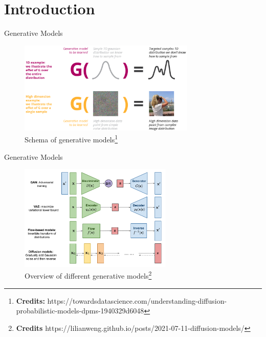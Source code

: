 \documentclass[aspectratio=169, 9pt]{beamer}
\theoremstyle{definition}
\begin{document}
\section{Introduction}
\begin{frame}{Generative Models}
  \begin{figure}[h!]
    \centering
    \includegraphics[width=0.75\textwidth]{./pic/generative-models-introa.png}
    \caption{Schema of generative
    models\footnote{\textbf{Credits:} https://towardsdatascience.com/understanding-diffusion-probabilistic-models-dpms-1940329d6048}}
  \end{figure}
\end{frame}
\begin{frame}{Generative Models}
  \begin{figure}[h]
    \centering
    \includegraphics[width=0.65\textwidth]{./pic/generative-overview.png}
    \caption{Overview of different generative
    models\footnote{\textbf{Credits}
  https://lilianweng.github.io/posts/2021-07-11-diffusion-models/}}
  \end{figure}
\end{frame}
\end{document}
